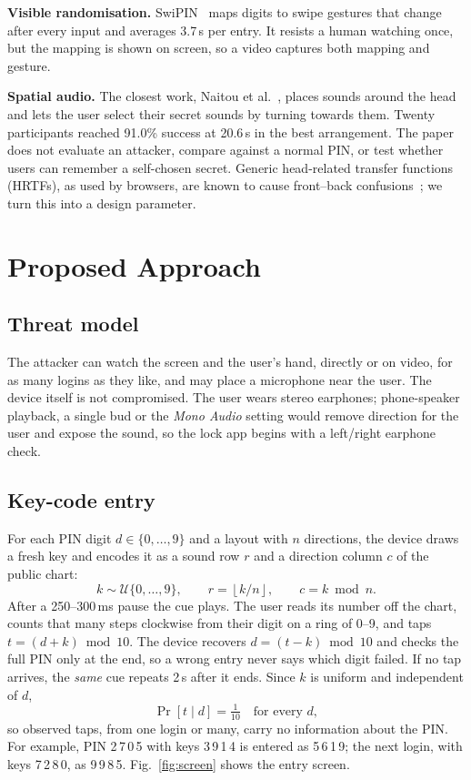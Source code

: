 \documentclass[conference]{IEEEtran}
\begin{document}
\textbf{Visible randomisation.} SwiPIN~\cite{vonzezschwitz2015swipin} maps digits to swipe gestures
that change after every input and averages 3.7\,s per entry. It resists a human watching once, but the
mapping is shown on screen, so a video captures both mapping and gesture.

\textbf{Spatial audio.} The closest work, Naitou et al.~\cite{naitou2026audiopin}, places sounds around
the head and lets the user select their secret sounds by turning towards them. Twenty participants
reached 91.0\% success at 20.6\,s in the best arrangement. The paper does not evaluate an attacker,
compare against a normal PIN, or test whether users can remember a self-chosen secret. Generic
head-related transfer functions (HRTFs), as used by browsers, are known to cause front--back
confusions~\cite{wenzel1993localization,wightman1999frontback}; we turn this into a design parameter.

\section{Proposed Approach}
\subsection{Threat model}
The attacker can watch the screen and the user's hand, directly or on video, for as many logins as they
like, and may place a microphone near the user. The device itself is not compromised. The user wears
stereo earphones; phone-speaker playback, a single bud or the \emph{Mono Audio} setting would remove
direction for the user and expose the sound, so the lock app begins with a left/right earphone check.

\subsection{Key-code entry}
For each PIN digit $d\in\{0,\dots,9\}$ and a layout with $n$ directions, the device draws a fresh key
and encodes it as a sound row $r$ and a direction column $c$ of the public chart:
\begin{equation}
k \sim \mathcal{U}\{0,\dots,9\},\qquad r=\left\lfloor k/n \right\rfloor,\qquad c = k \bmod n .
\label{eq:key}
\end{equation}
After a 250--300\,ms pause the cue plays. The user reads its number off the chart, counts that many
steps clockwise from their digit on a ring of 0--9, and taps $t=(d+k)\bmod 10$. The device recovers
$d=(t-k)\bmod 10$ and checks the full PIN only at the end, so a wrong entry never says which digit
failed. If no tap arrives, the \emph{same} cue repeats 2\,s after it ends. Since $k$ is uniform and
independent of $d$,
\begin{equation}
\Pr[t \mid d] = \tfrac{1}{10}\quad\text{for every } d,
\label{eq:uniform}
\end{equation}
so observed taps, from one login or many, carry no information about the PIN. For example, PIN
2\,7\,0\,5 with keys 3\,9\,1\,4 is entered as 5\,6\,1\,9; the next login, with keys 7\,2\,8\,0, as
9\,9\,8\,5. Fig.~\ref{fig:screen} shows the entry screen.
\end{document}
